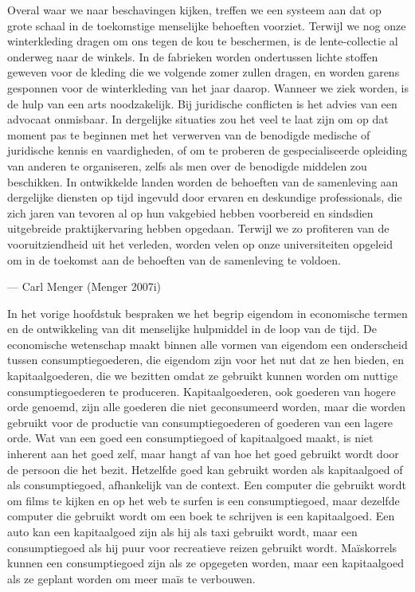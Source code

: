 \documentclass[
  a5paper,
  smalldemyvopaper,11pt,twoside,onecolumn,openright,extrafontsizes,
hidelinks]{memoir}
\begin{document}
Overal waar we naar beschavingen kijken, treffen we een systeem aan dat
op grote schaal in de toekomstige menselijke behoeften voorziet. Terwijl
we nog onze winterkleding dragen om ons tegen de kou te beschermen, is
de lente-collectie al onderweg naar de winkels. In de fabrieken worden
ondertussen lichte stoffen geweven voor de kleding die we volgende zomer
zullen dragen, en worden garens gesponnen voor de winterkleding van het
jaar daarop. Wanneer we ziek worden, is de hulp van een arts
noodzakelijk. Bij juridische conflicten is het advies van een advocaat
onmisbaar. In dergelijke situaties zou het veel te laat zijn om op dat
moment pas te beginnen met het verwerven van de benodigde medische of
juridische kennis en vaardigheden, of om te proberen de gespecialiseerde
opleiding van anderen te organiseren, zelfs als men over de benodigde
middelen zou beschikken. In ontwikkelde landen worden de behoeften van
de samenleving aan dergelijke diensten op tijd ingevuld door ervaren en
deskundige professionals, die zich jaren van tevoren al op hun vakgebied
hebben voorbereid en sindsdien uitgebreide praktijkervaring hebben
opgedaan. Terwijl we zo profiteren van de vooruitziendheid uit het
verleden, worden velen op onze universiteiten opgeleid om in de toekomst
aan de behoeften van de samenleving te voldoen.

--- Carl Menger (Menger 2007i)

In het vorige hoofdstuk bespraken we het begrip eigendom in economische
termen en de ontwikkeling van dit menselijke hulpmiddel in de loop van
de tijd. De economische wetenschap maakt binnen alle vormen van eigendom
een onderscheid tussen consumptiegoederen, die eigendom zijn voor het
nut dat ze hen bieden, en kapitaalgoederen, die we bezitten omdat ze
gebruikt kunnen worden om nuttige consumptiegoederen te produceren.
Kapitaalgoederen, ook goederen van hogere orde genoemd, zijn alle
goederen die niet geconsumeerd worden, maar die worden gebruikt voor de
productie van consumptiegoederen of goederen van een lagere orde. Wat
van een goed een consumptiegoed of kapitaalgoed maakt, is niet inherent
aan het goed zelf, maar hangt af van hoe het goed gebruikt wordt door de
persoon die het bezit. Hetzelfde goed kan gebruikt worden als
kapitaalgoed of als consumptiegoed, afhankelijk van de context. Een
computer die gebruikt wordt om films te kijken en op het web te surfen
is een consumptiegoed, maar dezelfde computer die gebruikt wordt om een
boek te schrijven is een kapitaalgoed. Een auto kan een kapitaalgoed
zijn als hij als taxi gebruikt wordt, maar een consumptiegoed als hij
puur voor recreatieve reizen gebruikt wordt. Maïskorrels kunnen een
consumptiegoed zijn als ze opgegeten worden, maar een kapitaalgoed als
ze geplant worden om meer maïs te verbouwen.
\end{document}
